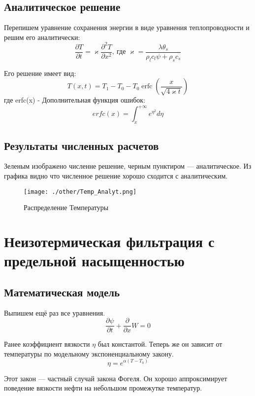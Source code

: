 \documentclass[12pt,a4paper]{article}
\newcommand{\pd}[2]{\frac{\partial #1}{\partial #2}}
\begin{document}
\subsection{Аналитическое решение}
Перепишем уравнение сохранения энергии в виде уравнения теплопроводности и решим его аналитически:
\begin{equation}
\pd{T}{t} = \varkappa\pd{^2 T}{x^2},\ \text{где } \varkappa = \frac{\lambda \theta_s}{\rho_l c_l \psi + \rho_s c_s}
\end{equation}

Его решение имеет вид:
\begin{equation}
T(x,t) = T_1-T_0 - T_0 \operatorname{erfc} \left(\frac{x}{\sqrt{4\varkappa t}}\right)	
\end{equation}
где erfc(x) - Дополнительная функция ошибок:
$$
erfc(x) = \int_{x}^{+\infty}e^{\eta^2}d\eta
$$
\subsection{Результаты численных расчетов}
Зеленым изображено численне решение, черным пунктиром --- аналитическое. Из графика видно что численное решение хорошо сходится с аналитическим.
\begin{figure}[h!]
\begin{center}
\texttt{[image: ./other/Temp\_Analyt.png]}
\caption{Распределение Температуры}
\end{center}
\end{figure}
\newpage
\section{Неизотермическая фильтрация с предельной насыщенностью}
\subsection{Математическая модель}

Выпишем ещё раз все уравнения.
$$
\pd{\psi}{t} + \pd{}{x}W = 0
$$

Ранее коэффициент вязкости $\eta$ был константой. Теперь же он зависит от температуры по модельному экспоненциальному закону.
\begin{equation}
\eta = e^{\alpha(T - T_{0})}
\label{viscos}
\end{equation}

Этот закон --- частный случай закона Фогеля. Он хорошо аппроксимирует поведение вязкости нефти на небольшом промежутке температур.
\end{document}
